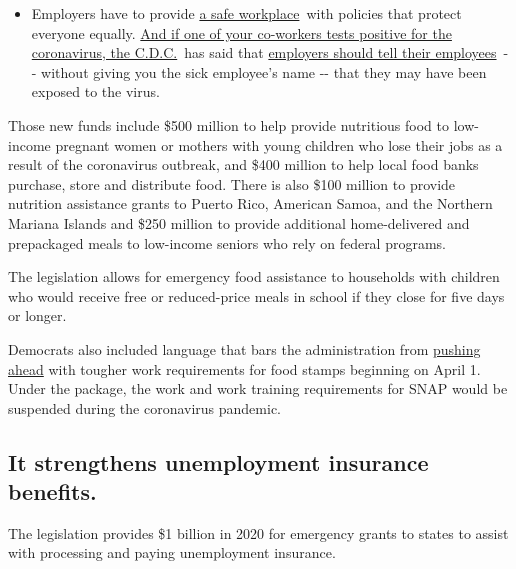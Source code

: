 \begin{itemize}
  \begin{itemize}
  \tightlist
  \item
    Employers have to provide
    \href{https://www.osha.gov/SLTC/covid-19/standards.html}{a safe
    workplace}~with policies that protect everyone equally.
    \href{https://www.nytimes3xbfgragh.onion/article/coronavirus-money-unemployment.html?action=click\&pgtype=Article\&state=default\&region=MAIN_CONTENT_3\&context=storylines_faq}{And
    if one of your co-workers tests positive for the coronavirus, the
    C.D.C.}~has said that
    \href{https://www.cdc.gov/coronavirus/2019-ncov/community/guidance-business-response.html}{employers
    should tell their employees}~-\/- without giving you the sick
    employee's name -\/- that they may have been exposed to the virus.
  \end{itemize}
\end{itemize}

Those new funds include \$500 million to help provide nutritious food to
low-income pregnant women or mothers with young children who lose their
jobs as a result of the coronavirus outbreak, and \$400 million to help
local food banks purchase, store and distribute food. There is also
\$100 million to provide nutrition assistance grants to Puerto Rico,
American Samoa, and the Northern Mariana Islands and \$250 million to
provide additional home-delivered and prepackaged meals to low-income
seniors who rely on federal programs.

The legislation allows for emergency food assistance to households with
children who would receive free or reduced-price meals in school if they
close for five days or longer.

Democrats also included language that bars the administration from
\href{https://www.nytimes3xbfgragh.onion/2020/03/13/us/politics/coronavirus-food-stamps-medicaid.html}{pushing
ahead} with tougher work requirements for food stamps beginning on April
1. Under the package, the work and work training requirements for SNAP
would be suspended during the coronavirus pandemic.

\hypertarget{it-strengthens-unemployment-insurance-benefits}{%
\subsection{It strengthens unemployment insurance
benefits.}\label{it-strengthens-unemployment-insurance-benefits}}

The legislation provides \$1 billion in 2020 for emergency grants to
states to assist with processing and paying unemployment insurance.

